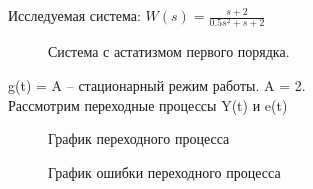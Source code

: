\documentclass[a4paper, 11pt]{article}
\begin{document}
Исследуемая система: \large{$W(s)=\frac{s+2}{0.5s^2+s+2}$}


\begin{figure}[h!]
    \caption{Система с астатизмом первого порядка.}
    \label{one}
\end{figure}

g(t) = A – стационарный режим работы. A = 2.\\

Рассмотрим переходные процессы Y(t) и e(t)

\begin{figure}[h!]
    \caption{График переходного процесса}
    \label{two}
\end{figure}
\begin{figure}[h!]
    \caption{График ошибки переходного процесса}
    \label{tree}
\end{figure}
\end{document}
